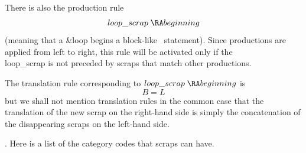 There is also the production rule
$$\\{loop\_scrap}\;\RA\;\\{beginning}$$
(meaning that a \&{loop} begins a block-like \ADA\ statement). Since
productions are applied from left to right, this rule will be activated
only if the \\{loop\_scrap} is not preceded by scraps that match other
productions.

The translation rule corresponding to $\\{loop\_scrap}\;\RA\;\\{beginning}$ is
$$B=L$$
but we shall not mention translation rules in the common case that the
translation of the new scrap on the right-hand side is simply the
concatenation of the disappearing scraps on the left-hand side.

\fi

. Here is a list of the category codes that scraps can have.

